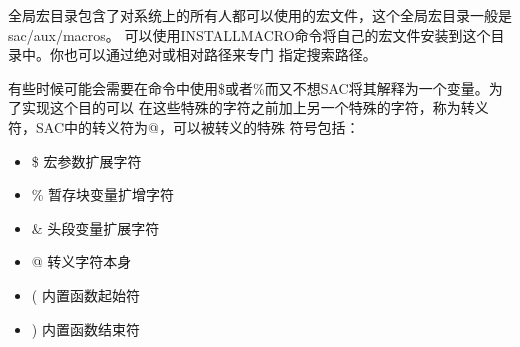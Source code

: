 全局宏目录包含了对系统上的所有人都可以使用的宏文件，这个全局宏目录一般是sac/aux/macros。
可以使用INSTALLMACRO命令将自己的宏文件安装到这个目录中。你也可以通过绝对或相对路径来专门
指定搜索路径。

有些时候可能会需要在命令中使用\$或者\%而又不想SAC将其解释为一个变量。为了实现这个目的可以
在这些特殊的字符之前加上另一个特殊的字符，称为转义符，SAC中的转义符为@，可以被转义的特殊
符号包括：
\begin{itemize}
\renewcommand\labelitemi{\dag}
\item \$  宏参数扩展字符
\item \%  暂存块变量扩增字符
\item \&  头段变量扩展字符
\item  @  转义字符本身
\item  (  内置函数起始符
\item  )  内置函数结束符
\end{itemize}
